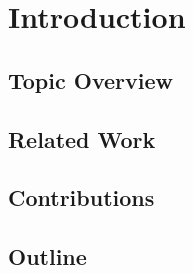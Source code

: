 \section{Introduction}
\subsection{Topic Overview}
\subsection{Related Work}
\subsection{Contributions}
\subsection{Outline}
